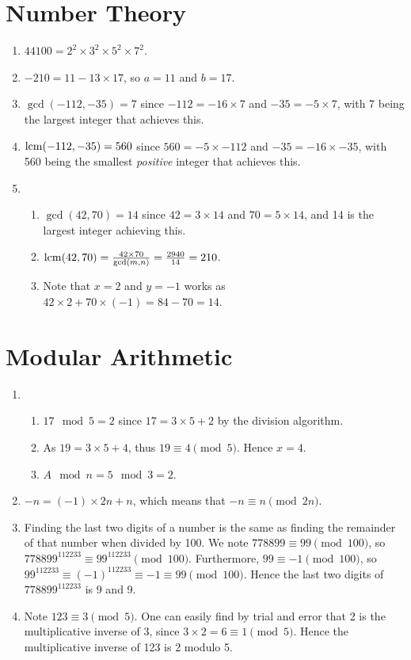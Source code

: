 \section{Number Theory}
\begin{enumerate}
    \item $44100 = 2^2 \times 3^2 \times 5^2 \times 7^2$.
    \item $-210 = 11 - 13 \times 17$, so $a = 11$ and $b = 17$.
    \item $\gcd(-112, -35) = 7$ since $-112 = -16 \times 7$ and $-35 = -5 \times 7$, with 7 being the largest integer that achieves this.
    \item $\mathrm{lcm}(-112, -35) = 560$ since $560 = -5 \times -112$ and $-35 = -16 \times -35$, with 560 being the smallest \textit{positive} integer that achieves this.
    \item \begin{enumerate}[label=(\roman*)]
        \item $\gcd(42, 70) = 14$ since $42 = 3 \times 14$ and $70 = 5 \times 14$, and 14 is the largest integer achieving this.
        \item $\mathrm{lcm}(42, 70) = \frac{42 \times 70}{\gcd(m, n)} = \frac{2940}{14} = 210$.
        \item Note that $x = 2$ and $y = -1$ works as $42 \times 2 + 70 \times (-1) = 84 - 70 = 14$.
    \end{enumerate}
\end{enumerate}

\section{Modular Arithmetic}
\begin{enumerate}
    \item \begin{enumerate}[label=(\alph*)]
        \item $17 \mod 5 = 2$ since $17 = 3 \times 5 + 2$ by the division algorithm.
        \item As $19 = 3 \times 5 + 4$, thus $19 \equiv 4 \pmod 5$. Hence $x = 4$.
        \item $A \mod n = 5 \mod 3 = 2$.
    \end{enumerate}
    \item $-n = (-1) \times 2n + n$, which means that $-n \equiv n \pmod{2n}$.
    \item Finding the last two digits of a number is the same as finding the remainder of that number when divided by 100. We note $778899 \equiv 99 \pmod{100}$, so $778899^{112233} \equiv 99^{112233} \pmod{100}$. Furthermore, $99 \equiv -1 \pmod{100}$, so $99^{112233}\equiv (-1)^{112233} \equiv -1 \equiv 99 \pmod{100}$. Hence the last two digits of $778899^{112233}$ is 9 and 9.
    \item Note $123 \equiv 3 \pmod 5$. One can easily find by trial and error that 2 is the multiplicative inverse of 3, since $3 \times 2 = 6 \equiv 1 \pmod 5$. Hence the multiplicative inverse of 123 is 2 modulo 5.
\end{enumerate}

\printbibliography[heading=bibintoc, title={References and Bibliography}]


